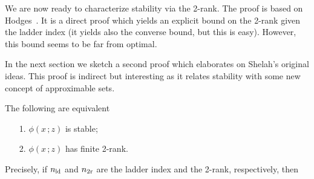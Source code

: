 \documentclass[scombinatorics.tex]{subfiles}
\begin{document}
We are now ready to characterize stability via the 2-rank.
The proof is based on Hodges~\cite{hodges}.
It is a direct proof which yields an explicit bound on the 2-rank given the ladder index (it yields also the converse bound, but this is easy).
However, this bound seems to be far from optimal.

In the next section we sketch a second proof which elaborates on Shelah's original ideas.
This proof is indirect but interesting as it relates stability with some new concept of approximable sets.

\begin{theorem}\label{thm_hodges}
  The following are equivalent
  \begin{itemize}
    \item[1.] $\phi(x\,;z)$ is stable;
    \item[2.] $\phi(x\,;z)$ has finite 2-rank.
  \end{itemize}
  Precisely, if $n_{\rm ld}$ and $n_{\rm 2r}$ are the ladder index and the 2-rank, respectively, then 
  

\end{theorem}
\end{document}
